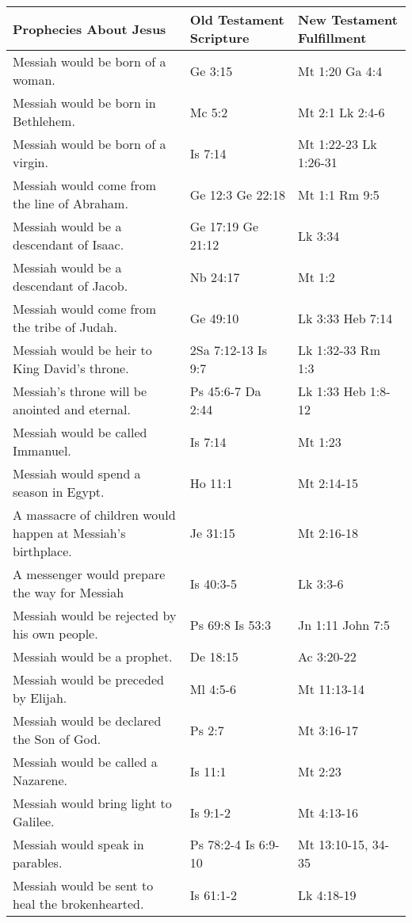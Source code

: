\documentclass[11pt]{article}
\begin{document}
\begin{center}
\begin{tabular}{lll}
Prophecies About Jesus & Old Testament Scripture & New Testament Fulfillment\\[0pt]
\hline
Messiah would be born of a woman. & Ge 3:15 & Mt 1:20 Ga 4:4\\[0pt]
Messiah would be born in Bethlehem. & Mc 5:2 & Mt 2:1 Lk 2:4-6\\[0pt]
Messiah would be born of a virgin. & Is 7:14 & Mt 1:22-23 Lk 1:26-31\\[0pt]
Messiah would come from the line of Abraham. & Ge 12:3 Ge 22:18 & Mt 1:1 Rm 9:5\\[0pt]
Messiah would be a descendant of Isaac. & Ge 17:19 Ge 21:12 & Lk 3:34\\[0pt]
Messiah would be a descendant of Jacob. & Nb 24:17 & Mt 1:2\\[0pt]
Messiah would come from the tribe of Judah. & Ge 49:10 & Lk 3:33 Heb 7:14\\[0pt]
Messiah would be heir to King David's throne. & 2Sa 7:12-13 Is 9:7 & Lk 1:32-33 Rm 1:3\\[0pt]
Messiah's throne will be anointed and eternal. & Ps 45:6-7 Da 2:44 & Lk 1:33 Heb 1:8-12\\[0pt]
Messiah would be called Immanuel. & Is 7:14 & Mt 1:23\\[0pt]
Messiah would spend a season in Egypt. & Ho 11:1 & Mt 2:14-15\\[0pt]
A massacre of children would happen at Messiah's birthplace. & Je 31:15 & Mt 2:16-18\\[0pt]
A messenger would prepare the way for Messiah & Is 40:3-5 & Lk 3:3-6\\[0pt]
Messiah would be rejected by his own people. & Ps 69:8 Is 53:3 & Jn 1:11 John 7:5\\[0pt]
Messiah would be a prophet. & De 18:15 & Ac 3:20-22\\[0pt]
Messiah would be preceded by Elijah. & Ml 4:5-6 & Mt 11:13-14\\[0pt]
Messiah would be declared the Son of God. & Ps 2:7 & Mt 3:16-17\\[0pt]
Messiah would be called a Nazarene. & Is 11:1 & Mt 2:23\\[0pt]
Messiah would bring light to Galilee. & Is 9:1-2 & Mt 4:13-16\\[0pt]
Messiah would speak in parables. & Ps 78:2-4 Is 6:9-10 & Mt 13:10-15, 34-35\\[0pt]
Messiah would be sent to heal the brokenhearted. & Is 61:1-2 & Lk 4:18-19\\[0pt]

\end{tabular}
\end{center}
\end{document}
